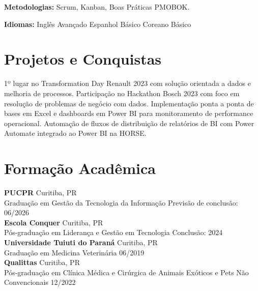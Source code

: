 \documentclass[11pt,a4paper]{article}
\begin{document}
\textbf{Metodologias:} Scrum, Kanban, Boas Práticas PMOBOK.

\textbf{Idiomas:} Inglês Avançado \enspace\textbullet\enspace Espanhol Básico \enspace\textbullet\enspace Coreano Básico

\section{Projetos e Conquistas}

1º lugar no Transformation Day Renault 2023 com solução orientada a dados e melhoria de processos. Participação no Hackathon Bosch 2023 com foco em resolução de problemas de negócio com dados. Implementação ponta a ponta de bases em Excel e dashboards em Power BI para monitoramento de performance operacional. Automação de fluxos de distribuição de relatórios de BI com Power Automate integrado ao Power BI na HORSE.

\section{Formação Acadêmica}

\textbf{PUCPR} \hfill Curitiba, PR\\
Graduação em Gestão da Tecnologia da Informação \hfill Previsão de conclusão: 06/2026\\[6pt]

\textbf{Escola Conquer} \hfill Curitiba, PR\\
Pós-graduação em Liderança e Gestão em Tecnologia \hfill Conclusão: 2024\\[6pt]

\textbf{Universidade Tuiuti do Paraná} \hfill Curitiba, PR\\
Graduação em Medicina Veterinária \hfill 06/2019\\[6pt]

\textbf{Qualittas} \hfill Curitiba, PR\\
Pós-graduação em Clínica Médica e Cirúrgica de Animais Exóticos e Pets Não Convencionais \hfill 12/2022
\end{document}
